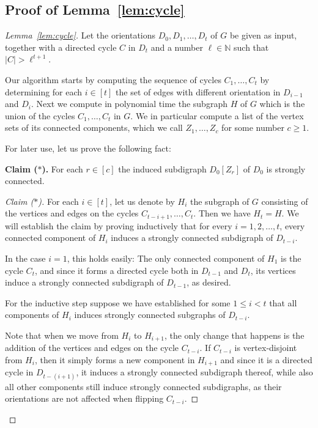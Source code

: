 \documentclass[runningheads]{llncs}
\begin{document}
\subsection{Proof of Lemma~\ref{lem:cycle}}

\begin{proof}[Lemma~\ref{lem:cycle}]
Let the orientations $D_0,D_1,\ldots,D_t$ of $G$ be given as input, together with a directed cycle $C$ in $D_t$ and a number $\ell \in \mathbb{N}$ such that $|C|>\ell^{t+1}$.

Our algorithm starts by computing the sequence of cycles $C_1,\ldots,C_t$ by determining for each $i \in [t]$ the set of edges with different orientation in $D_{i-1}$ and $D_i$. Next we compute in polynomial time the subgraph $H$ of $G$ which is the union of the cycles $C_1,\ldots,C_t$ in $G$. We in particular compute a list of the vertex sets of its connected components, which we call $Z_1,\ldots,Z_c$ for some number $c \ge 1$.

For later use, let us prove the following fact:

\medskip

\textbf{Claim ($\ast$).} For each $r \in [c]$ the induced subdigraph $D_0[Z_r]$ of $D_0$ is strongly connected. 
\begin{proof}[Claim ($\ast$)]
For each $i \in [t]$, let us denote by $H_i$ the subgraph of $G$ consisting of the vertices and edges on the cycles $C_{t-i+1}, \ldots, C_t$.  Then we have $H_t=H$. We will establish the claim by proving inductively that for every $i=1,2,\ldots,t$, every connected component of $H_i$ induces a strongly connected subdigraph of $D_{t-i}$.

In the case $i=1$, this holds easily: The only connected component of $H_1$ is the cycle $C_t$, and since it forms a directed cycle both in $D_{t-1}$ and $D_t$, its vertices induce a strongly connected subdigraph of $D_{t-1}$, as desired. 

For the inductive step suppose we have established for some $1 \le i<t$ that all components of $H_i$ induces strongly connected subgraphs of $D_{t-i}$.

Note that when we move from $H_i$ to $H_{i+1}$, the only change that happens is the addition of the vertices and edges on the cycle $C_{t-i}$. If $C_{t-i}$ is vertex-disjoint from $H_i$, then it simply forms a new component in $H_{i+1}$ and since it is a directed cycle in $D_{t-(i+1)}$, it induces a strongly connected subdigraph thereof, while also all other components still induce strongly connected subdigraphs, as their orientations are not affected when flipping $C_{t-i}$. 


\end{proof}
\end{proof}
\end{document}
